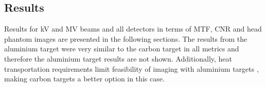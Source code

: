 

\subsection{Results}

Results for kV and MV beams and all detectors in terms of MTF, CNR and head phantom images are presented in the following sections. The results from the aluminium target were very similar to the carbon target in all metrics and therefore the aluminium target results are not shown. Additionally, heat transportation requirements limit feasibility of imaging with aluminium targets \cite{Parsons2012BeamTargets}, making carbon targets a better option in this case.

